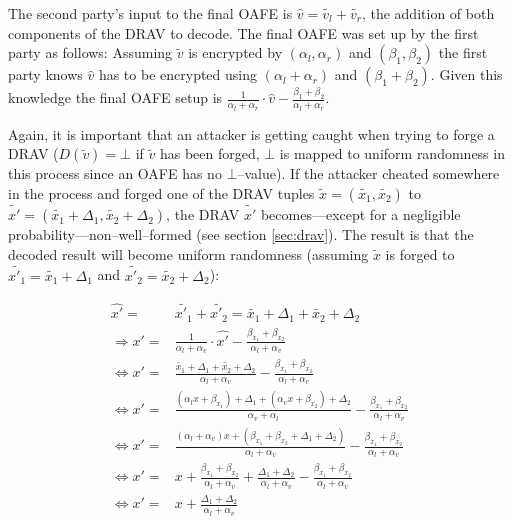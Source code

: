 The second party's input to the final OAFE is $\widehat{v} = \widetilde{v_l} +
\widetilde{v_r}$, the addition of both components of the DRAV to decode.  The
final OAFE was set up by the first party as follows: Assuming $\widetilde{v}$ is
encrypted by $(\alpha_l, \alpha_r)$ and $(\beta_1, \beta_2)$ the first party
knows $\widehat{v}$ has to be encrypted using $(\alpha_l + \alpha_r)$ and
$(\beta_1 + \beta_2)$.  Given this knowledge the final OAFE setup is
$\frac{1}{\alpha_l + \alpha_r} \cdot \widehat{v} - \frac{\beta_1 +
\beta_2}{\alpha_l + \alpha_r}$.

Again, it is important that an attacker is getting caught when trying to forge a
DRAV ($D(\widetilde{v}) = \bot$ if $\widetilde{v}$ has been forged, $\bot$ is
mapped to uniform randomness in this process since an OAFE has no
$\bot$--value). If the attacker cheated somewhere in the process and forged one
of the DRAV tuples $\widetilde{x} = (\widetilde{x_1}, \widetilde{x_2})$ to
$\widetilde{x'} = (\widetilde{x_1} + \Delta_1, \widetilde{x_2} + \Delta_2)$, the
DRAV $\widetilde{x'}$ becomes---except for a negligible
probability---non--well--formed (see section \ref{sec:drav}). The result is that
the decoded result will become uniform randomness (assuming $\widetilde{x}$ is
forged to $\widetilde{x'_1} = \widetilde{x_1} + \Delta_1$ and $\widetilde{x'_2}
= \widetilde{x_2} + \Delta_2$):

\begin{align*}
  \widehat{x'} = & \widetilde{x'_1} + \widetilde{x'_2} = \widetilde{x_1} +
  \Delta_1 + \widetilde{x_2} + \Delta_2 \\
  \Rightarrow x' = & \frac{1}{\alpha_l + \alpha_v} \cdot \widehat{x'} -
  \frac{\beta_{x_1} +
  \beta_{x_2}}{\alpha_l + \alpha_v} \\
  \Leftrightarrow x' = & \frac{\widetilde{x_1} + \Delta_1 +
  \widetilde{x_2} + \Delta_2}{\alpha_l + \alpha_v} -
  \frac{\beta_{x_1} +\beta_{x_2}}{\alpha_l + \alpha_v}\\
  \Leftrightarrow x' = & \frac{(\alpha_l x + \beta_{x_1}) + \Delta_1 +
  (\alpha_v x + \beta_{x_2}) + \Delta_2}{\alpha_v + \alpha_l} -
  \frac{\beta_{x_1} +\beta_{x_2}}{\alpha_l + \alpha_v} \\
  \Leftrightarrow x' = & \frac{(\alpha_l+\alpha_v)x + (\beta_{x_1}+\beta_{x_2} +
  \Delta_1+\Delta_2)}{\alpha_l+\alpha_v} -
  \frac{\beta_{x_1} +\beta_{x_2}}{\alpha_l + \alpha_v} \\
  \Leftrightarrow x' = & x + \frac{\beta_{x_1}+\beta_{x_2}}{\alpha_l+\alpha_v}
  + \frac{\Delta_1 + \Delta_2}{\alpha_l + \alpha_v} -
  \frac{\beta_{x_1}+\beta_{x_2}}{\alpha_l + \alpha_v} \\
  \Leftrightarrow x' = & x + \frac{\Delta_1 + \Delta_2}{\alpha_l + \alpha_v}\\
\end{align*}

